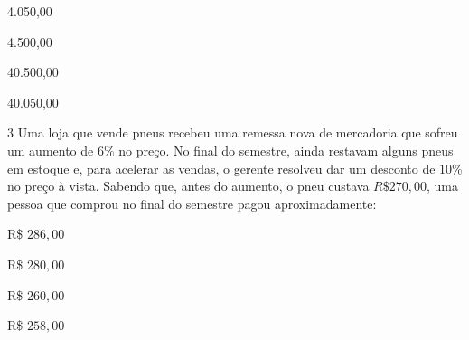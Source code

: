 \begin{multicols}{4}
\begin{escolha}[itemsep=0pt]
    \item 4.050,00
    \item 4.500,00
    \item 40.500,00 
    \item 40.050,00
\end{escolha}
\end{multicols}



\num{3} Uma loja que vende pneus recebeu uma remessa nova de mercadoria que
sofreu um aumento de $6\%$ no preço. No final do semestre, ainda restavam
alguns pneus em estoque e, para acelerar as vendas, o gerente resolveu
dar um desconto de $10\%$ no preço à vista. Sabendo que, antes do aumento,
o pneu custava $R\$270,00$, uma pessoa que comprou no final do semestre
pagou aproximadamente:

\begin{multicols}{2}
\begin{escolha}[itemsep=0pt]
  \item R\$ $286,00$
  \item R\$ $280,00$
  \item R\$ $260,00$
  \item R\$ $258,00$ 
\end{escolha}
\end{multicols}


